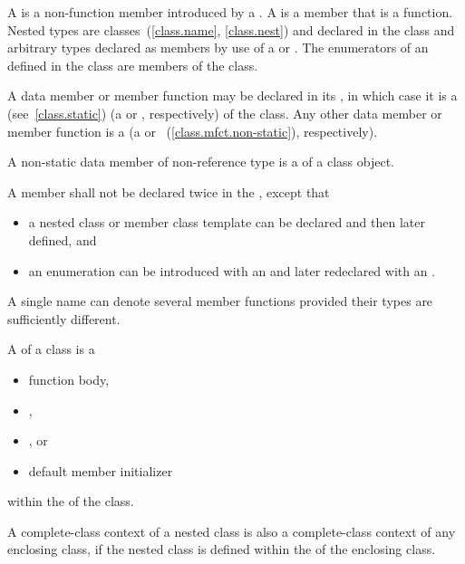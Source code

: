 \pnum
A  is a non-function member introduced by a
.
A  is a member that is a function.
Nested types are classes~(\ref{class.name}, \ref{class.nest}) and
 declared in the class and arbitrary types
declared as members by use of a 
or .
The enumerators of an  defined in the class
are members of the class.

%
%
%
\pnum
A data member or member function
may be declared  in its ,
in which case it is a  (see~\ref{class.static})
(a  or
, respectively)
of the class.
Any other data member or member function is a 
(a  or
~(\ref{class.mfct.non-static}), respectively).
\begin{note}
A non-static data member of non-reference
type is a  of a class object.
\end{note}

\pnum
A member shall not be declared twice in the
, except that
\begin{itemize}
\item a nested class or member
class template can be declared and then later defined, and
\item an
enumeration can be introduced with an  and later
redeclared with an .
\end{itemize}
\begin{note}
A single name can denote several member functions provided their types
are sufficiently different.
\end{note}

\pnum
{}%
A  of a class is a
\begin{itemize}
\item function body,
\item {},
\item {}, or
\item default member initializer
\end{itemize}
within the  of the class.
\begin{note}
A complete-class context of a nested class is also a complete-class
context of any enclosing class, if the nested class is defined within
the  of the enclosing class.
\end{note}

